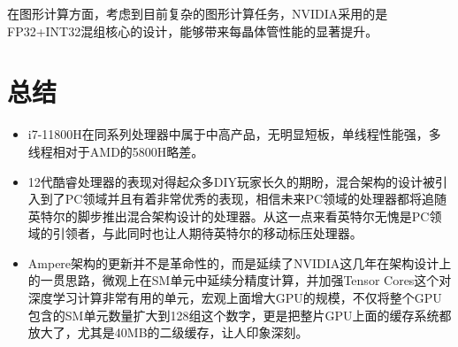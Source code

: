 \documentclass[a4paper]{article}
\begin{document}
在图形计算方面，考虑到目前复杂的图形计算任务，NVIDIA采用的是FP32+INT32混组核心的设计，能够带来每晶体管性能的显著提升。

\section{总结}
\begin{itemize}
	\item i7-11800H在同系列处理器中属于中高产品，无明显短板，单线程性能强，多线程相对于AMD的5800H略差。
	\item 12代酷睿处理器的表现对得起众多DIY玩家长久的期盼，混合架构的设计被引入到了PC领域并且有着非常优秀的表现，相信未来PC领域的处理器都将追随英特尔的脚步推出混合架构设计的处理器。从这一点来看英特尔无愧是PC领域的引领者，与此同时也让人期待英特尔的移动标压处理器。
	\item Ampere架构的更新并不是革命性的，而是延续了NVIDIA这几年在架构设计上的一贯思路，微观上在SM单元中延续分精度计算，并加强Tensor Cores这个对深度学习计算非常有用的单元，宏观上面增大GPU的规模，不仅将整个GPU包含的SM单元数量扩大到128组这个数字，更是把整片GPU上面的缓存系统都放大了，尤其是40MB的二级缓存，让人印象深刻。

\end{itemize}


\newpage



\end{document}
